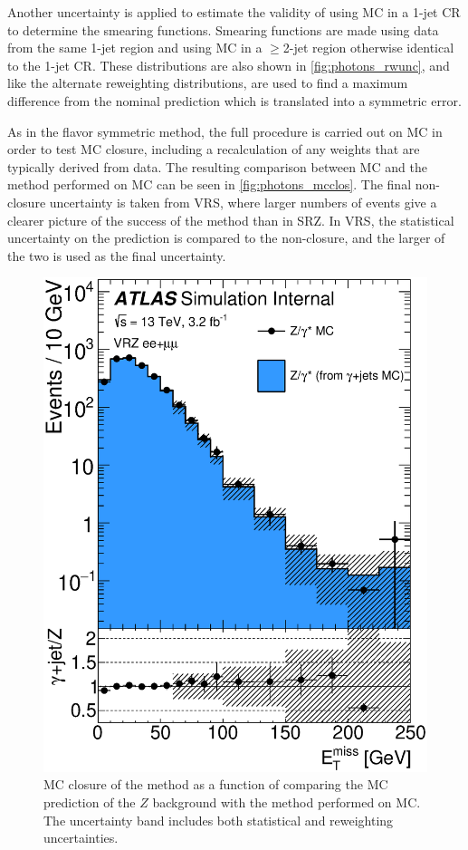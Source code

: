 Another uncertainty is applied to estimate the validity of using \ac{MC} in a 1-jet \ac{CR} to determine the smearing functions. Smearing functions are made using data from the same 1-jet region and using \ac{MC} in a $\geq$2-jet region otherwise identical to the 1-jet \ac{CR}. These distributions are also shown in \autoref{fig:photons_rwunc}, and like the alternate reweighting distributions, are used to find a maximum difference from the nominal prediction which is translated into a symmetric error. 

As in the flavor symmetric method, the full procedure is carried out on \ac{MC} in order to test \ac{MC} closure, including a recalculation of any weights that are typically derived from data. The resulting comparison between \dyjets \ac{MC} and the \gjets method performed on \ac{MC} can be seen in \autoref{fig:photons_mcclos}. The final non-closure uncertainty is taken from VRS, where larger numbers of events give a clearer picture of the success of the method than in SRZ. In VRS, the statistical uncertainty on the prediction is compared to the non-closure, and the larger of the two is used as the final uncertainty. 

\begin{centering}
\begin{figure}[!hbt]
\myfloatalign
\includegraphics[width=.85\linewidth]{figures/photons/gamma_jet_closure_ee_mm.eps}
\caption{\ac{MC} closure of the \gjets method as a function of \met comparing the \ac{MC} prediction of the $Z$ background with the \gjets method performed on \gjets \ac{MC}. The uncertainty band includes both statistical and reweighting uncertainties.}
\label{fig:photons_mcclos}
\end{figure}
\end{centering}

